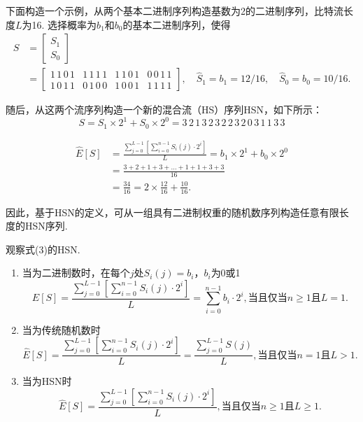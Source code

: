 \documentclass{solitairemiya-art}
\begin{document}
\begin{example}
下面构造一个示例，从两个基本二进制序列构造基数为2的二进制序列，比特流长度$L$为16. 选择概率为$b_1$和$b_0$的基本二进制序列，使得
\[
\begin{aligned}
S &= \left[ \begin{array}{c} S_1 \\ S_0 \end{array} \right] \\
&= \left[ \begin{array}{cccc} 1\,1\,0\,1 & 1\,1\,1\,1 & 1\,1\,0\,1 & 0\,0\,1\,1 \\ 1\,0\,1\,1 & 0\,1\,0\,0 & 1\,0\,0\,1 & 1\,1\,1\,1 \end{array} \right], \quad \hat{S}_1 = b_1 = 12/16, \quad \hat{S}_0 = b_0 = 10/16.
\end{aligned}
\]

随后，从这两个流序列构造一个新的混合流（HS）序列HSN，如下所示：
\[
S = S_1 \times 2^1 + S_0 \times 2^0 = 3\,2\,1\,3\,2\,3\,2\,2\,3\,2\,0\,3\,1\,1\,3\,3
\]

\[
\begin{aligned}
\hat{E}[S] &= \frac{\sum_{j=0}^{L-1} \left[ \sum_{i=0}^{n-1} S_i(j) \cdot 2^i \right]}{L} = b_1 \times 2^1 + b_0 \times 2^0 \\
&= \frac{3 + 2 + 1 + 3 + \dots + 1 + 1 + 3 + 3}{16} \\
&= \frac{34}{16} = 2 \times \frac{12}{16} + \frac{10}{16}.
\end{aligned}
\]
\end{example}

因此，基于HSN的定义，可从一组具有二进制权重的随机数序列构造任意有限长度的HSN序列. 

\begin{definition}
观察式(3)的HSN. 
\begin{enumerate}
\item 当为二进制数时，在每个$j$处$S_i(j) = b_i$，$b_i$为0或1
\[
\hat{E}[S] = \frac{\sum_{j=0}^{L-1} [\sum_{i=0}^{n-1} S_i(j) \cdot 2^i]}{L} = \sum_{i=0}^{n-1} b_i \cdot 2^i, \text{当且仅当} n \geq 1 \text{且} L = 1.
\]

\item 当为传统随机数时
\[
\hat{E}[S] = \frac{\sum_{j=0}^{L-1} [\sum_{i=0}^{n-1} S_i(j) \cdot 2^i]}{L} = \frac{\sum_{j=0}^{L-1} S(j)}{L}, \text{当且仅当} n = 1 \text{且} L > 1.
\]

\item 当为HSN时
\[
\hat{E}[S] = \frac{\sum_{j=0}^{L-1} \left[ \sum_{i=0}^{n-1} S_i(j) \cdot 2^i \right]}{L}, \text{当且仅当} n \geq 1 \text{且} L \geq 1.
\]
\end{enumerate}
\end{definition}
\end{document}
